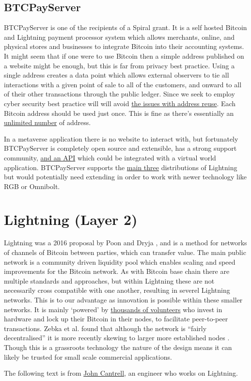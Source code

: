 \subsection{BTCPayServer}
BTCPayServer is one of the recipients of a Spiral grant. It is a self hosted Bitcoin and Lightning payment processor system which allows merchants, online, and physical stores and businesses to integrate Bitcoin into their accounting systems. It might seem that if one were to use Bitcoin then a simple address published on a website might be enough, but this is far from privacy best practice. Using a single address creates a data point which allows external observers to tie all interactions with a given point of sale to all of the customers, and onward to all of their other transactions through the public ledger. Since we seek to employ cyber security best practice will will avoid \href{https://en.bitcoin.it/wiki/Address_reuse}{the issues with address reuse}. Each Bitcoin address should be used just once. This is fine as there's essentially an \href{https://privacypros.io/btc-faq/how-many-btc-addresses}{unlimited number} of address.\par
In a metaverse application there is no website to interact with, but fortunately BTCPayServer is completely open source and extensible, has a strong support community, \href{https://docs.btcpayserver.org/API/Greenfield/v1/#operation/Invoices_CreateInvoice}{and an API} which could be integrated with a virtual world application. 
BTCPayServer supports the \href{https://docs.btcpayserver.org/LightningNetwork/}{main three} distributions of Lightning but would potentially need extending in order to work with newer technology like RGB or Omnibolt.
\section{Lightning (Layer 2)}
Lightning was a 2016 proposal by Poon and Dryja \cite{poon2016bitcoin}, and is a method for networks of channels of Bitcoin between parties, which can transfer value. The main public network is a community driven liquidity pool which enables scaling and speed improvements for the Bitcoin network. As with Bitcoin base chain there are multiple standards and approaches, but within Lightning these are not necessarily cross compatible with one another, resulting in severel Lightning networks. This is to our advantage as innovation is possible within these smaller networks. It is mainly `powered' by \href{https://plebnet.wiki/wiki/Main_Page}{thousands of volunteers} who invest in hardware and lock up their Bitcoin in their nodes, to facilitate peer-to-peer transactions. Zebka et al. found that although the network is ``fairly decentralised'' it is more recently skewing to larger more established nodes \cite{zabka2022short}. Though this is a grassroots technology the nature of the design means it can likely be trusted for small scale commercial applications.\par
The following text is from \href{https://medium.com/@johncantrell97?p=5cc72f2c664}{John Cantrell}, an engineer who works on Lightning.\par

